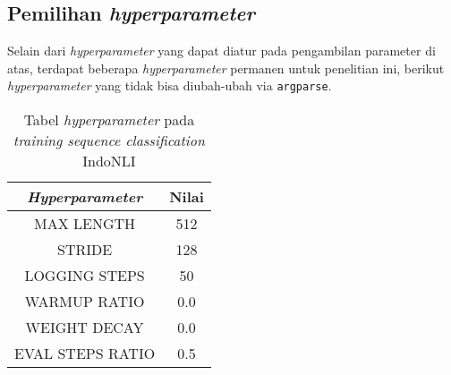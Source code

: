 \subsection{Pemilihan \emph{hyperparameter}}
Selain dari \emph{hyperparameter} yang dapat diatur pada pengambilan parameter di atas, terdapat beberapa \emph{hyperparameter} permanen untuk penelitian ini, berikut \emph{hyperparameter} yang tidak bisa diubah-ubah via \texttt{argparse}.

\begin{table}[h]
\centering
\begin{tabular}{||c | c||} 
 \hline
 \emph{Hyperparameter} & Nilai \\ [0.5ex] 
 \hline\hline
 MAX LENGTH & 512 \\ 
 STRIDE & 128 \\
 LOGGING STEPS & 50 \\
 WARMUP RATIO & 0.0 \\
 WEIGHT DECAY & 0.0 \\ 
 EVAL STEPS RATIO & 0.5 \\ [1ex] 
 \hline\hline
\end{tabular}
\caption{Tabel \emph{hyperparameter} pada \emph{training sequence classification} IndoNLI}
\end{table}

